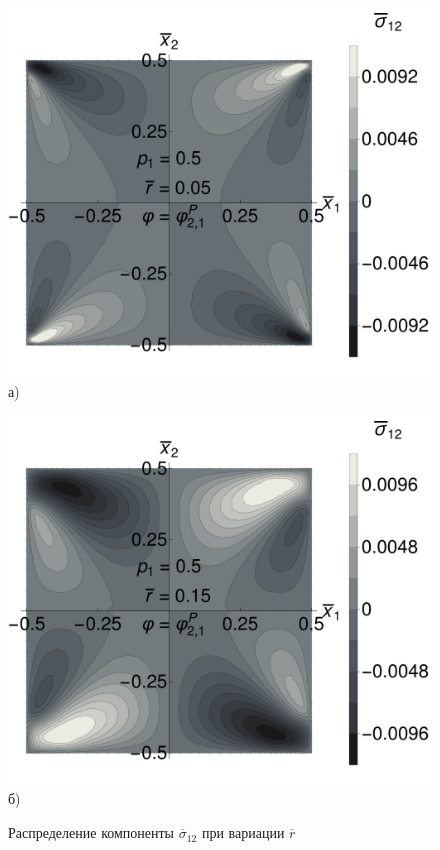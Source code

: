 \begin{figure}[ht]
    \begin{minipage}[b][][b]{0.49\linewidth}\centering
        \includegraphics[width=\linewidth]{pics/Sigma12R005.pdf} \\ а)
    \end{minipage}
    \hfill
    \begin{minipage}[b][][b]{0.49\linewidth}\centering
        \includegraphics[width=\linewidth]{pics/Sigma12R015.pdf} \\ б)
    \end{minipage}
    \caption{Распределение компоненты $\overline{\sigma}_{12}$ при вариации $\overline{r}$}
    \label{fig:Sigma12}
\end{figure}

